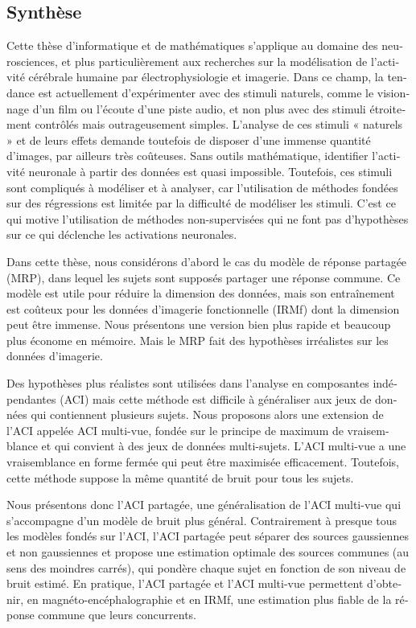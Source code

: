\begin{otherlanguage}{french}
\chapter*{Synthèse}
Cette thèse d'informatique et de mathématiques s'applique au domaine des neurosciences, et plus particulièrement aux recherches sur la modélisation de l'activité cérébrale humaine par électrophysiologie et imagerie.
%
Dans ce champ, la tendance est actuellement d’expérimenter avec des stimuli naturels, comme le visionnage d’un film ou l’écoute d’une piste audio, et non plus avec des stimuli étroitement contrôlés mais outrageusement simples.
%
L’analyse de ces stimuli « naturels » et de leurs effets demande toutefois de disposer d’une immense quantité d’images, par ailleurs très coûteuses. Sans outils mathématique, identifier l'activité neuronale à partir des données est quasi impossible.
%
Toutefois, ces stimuli sont compliqués à modéliser et à analyser, car l'utilisation de méthodes fondées sur des régressions est limitée par la difficulté de modéliser les stimuli.
%
C'est ce qui motive l'utilisation de méthodes non-supervisées qui ne font pas d'hypothèses sur ce qui déclenche les activations neuronales.

Dans cette thèse, nous considérons d'abord le cas du modèle de réponse partagée (MRP), dans lequel les sujets sont supposés partager une réponse commune. Ce modèle est utile pour réduire la dimension des données, mais son entraînement est coûteux pour les données d'imagerie fonctionnelle (IRMf) dont la dimension peut être immense.
%
Nous présentons une version bien plus rapide et beaucoup plus économe en mémoire. Mais le MRP fait des hypothèses irréalistes sur les données d'imagerie.

Des hypothèses plus réalistes sont utilisées dans l'analyse en composantes indépendantes (ACI) mais cette méthode est difficile à généraliser aux jeux de données qui contiennent plusieurs sujets.
%
Nous proposons alors une extension de l'ACI appelée ACI multi-vue, fondée sur le principe de maximum de vraisemblance
et qui convient à des jeux de données multi-sujets.
%
L’ACI multi-vue a une vraisemblance en forme fermée qui peut être maximisée efficacement. Toutefois, cette méthode suppose la même quantité de bruit pour tous les sujets.

Nous présentons donc l’ACI partagée, une généralisation de l’ACI multi-vue qui s'accompagne d'un modèle de bruit plus général.
%
Contrairement à presque tous les modèles fondés sur l'ACI, l’ACI partagée peut séparer des sources gaussiennes et non gaussiennes et propose une estimation optimale des sources communes (au sens des moindres carrés), qui pondère chaque sujet en fonction de son niveau de bruit estimé.
%
En pratique, l’ACI partagée et l’ACI multi-vue permettent d'obtenir, en magnéto-encéphalographie et en IRMf, une estimation plus fiable de la réponse commune que leurs concurrents.


\end{otherlanguage}
